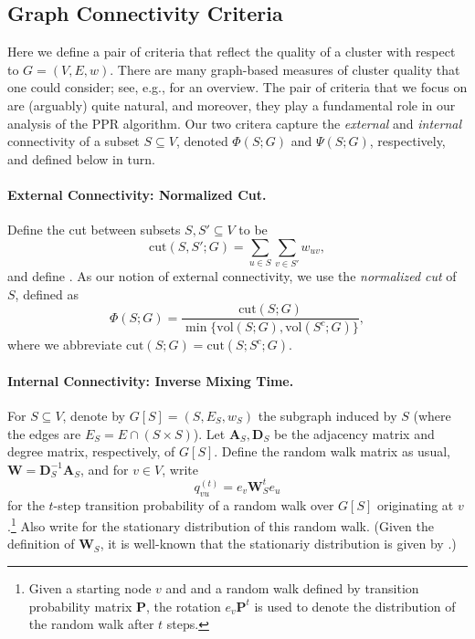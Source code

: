 \documentclass{article}
\newcommand{\vol}{\mathrm{vol}}
\newcommand{\cut}{\mathrm{cut}}
\newcommand{\1}{\mathbf{1}}
\newcommand{\pibf}{\bm{\pi}}
\newcommand{\Abf}{\mathbf{A}}
\newcommand{\Wbf}{\mathbf{W}}
\newcommand{\Dbf}{\mathbf{D}}
\theoremstyle{aldenthm}
\theoremstyle{aldenrmrk}
\begin{document}
\subsection{Graph Connectivity Criteria}

Here we define a pair of criteria that reflect the quality of a cluster with
respect to $G=(V,E,w)$.  There are many graph-based measures of cluster quality  
that one could consider; see, e.g., \citet{yang2015,fortunato2010} for 
an overview.  The pair of criteria that we focus on are (arguably) quite
natural, and moreover, they play a fundamental role in our analysis 
of the PPR algorithm.  Our two critera capture the \emph{external} and
\emph{internal} connectivity of a subset $S \subseteq V$, denoted $\Phi(S; G)$
and $\Psi(S; G)$, respectively, and defined below in turn.  

\paragraph{External Connectivity: Normalized Cut.}

Define the cut between subsets $S,S' \subseteq V$ to be
$$
\cut(S, S'; G) = \sum_{u \in S} \sum_{v \in S'} w_{uv},
$$
and define
\smash{$\vol(S; G) = \cut(S, V; G) = \sum_{u \in S} \sum_{v \in V} w_{uv}$}.  
As our notion of external connectivity, we use the \emph{normalized cut}  
of $S$, defined as 
\begin{equation}
\label{eqn: norm_cut}
\Phi(S; G) = \frac{\cut(S; G)}{\min\{\vol(S; G), \vol(S^c; G)\}},
\end{equation} 
where we abbreviate $\cut(S; G) = \cut(S; S^c; G)$.

\paragraph{Internal Connectivity: Inverse Mixing Time.}

For $S \subseteq V$, denote by $G[S] = (S, E_S, w_S)$ the subgraph induced by 
$S$ (where the edges are $E_S = E \cap (S \times S)$). Let $\Abf_S,\Dbf_S$
be the adjacency matrix and degree matrix, respectively, of $G[S]$.  Define the
random walk matrix as usual, $\Wbf = \Dbf_S^{-1} \Abf_S$, and for $v \in V$,
write 
\begin{equation}
\label{eqn: random_walk}
q_{vu}^{(t)} = e_v\Wbf_S^t e_u
\end{equation}
for the $t$-step transition probability of a random walk over $G[S]$
originating at $v$.\footnote{Given a starting node $v$ and and a random walk
  defined by transition probability matrix $\mathbf{P}$, the rotation $e_v
  \mathbf{P}^t$ is used to denote the distribution of the random walk after $t$
  steps.}   Also write \smash{$\tilde\pibf = (\tilde\pi_{u})_{u \in S}$} for the 
  stationary distribution of this random walk.  (Given the definition of
  $\Wbf_S$, it is well-known that the stationariy distribution is given by
  \smash{$\tilde\pi_{u} = (\Dbf_{S})_{uu} / \vol(S; G[S])$}.) 
\end{document}
